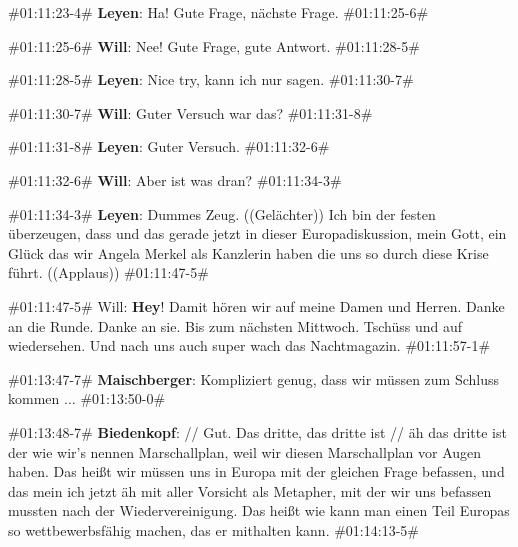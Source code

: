 {\begin{description}
\begin{linenumbers}
		\item \#01:11:23-4\# \textbf{Leyen}: Ha! Gute Frage, nächste Frage. \#01:11:25-6\# 
		
		\item \#01:11:25-6\# \textbf{Will}: Nee! Gute Frage, gute Antwort. \#01:11:28-5\# 
		
		\item \#01:11:28-5\# \textbf{Leyen}: Nice try, kann ich nur sagen. \#01:11:30-7\# 
		
		\item \#01:11:30-7\# \textbf{Will}: Guter Versuch war das? \#01:11:31-8\# 
		
		\item \#01:11:31-8\# \textbf{Leyen}: Guter Versuch. \#01:11:32-6\# 
		
		\item \#01:11:32-6\# \textbf{Will}: Aber ist was dran? \#01:11:34-3\# 
		
		\item \#01:11:34-3\# \textbf{Leyen}: Dummes Zeug. ((Gelächter)) Ich bin der festen überzeugen, dass und das gerade jetzt in dieser Europadiskussion, mein Gott, ein Glück das wir Angela Merkel als Kanzlerin haben die uns so durch diese Krise führt. ((Applaus)) \#01:11:47-5\# 
		
		\item \#01:11:47-5\# Will: \textbf{Hey}! Damit hören wir auf meine Damen und Herren. Danke an die Runde. Danke an sie. Bis zum nächsten Mittwoch. Tschüss und auf wiedersehen. Und nach uns auch super wach das Nachtmagazin. \#01:11:57-1\#
	\end{linenumbers}
	\label{lis:34}
\end{description}

\begin{description}
	\begin{linenumbers}
		\item \#01:13:47-7\# \textbf{Maischberger}: Kompliziert genug, dass wir müssen zum Schluss kommen $\ldots$ \#01:13:50-0\#
		
		\item \#01:13:48-7\# \textbf{Biedenkopf}: // Gut. Das dritte, das dritte ist // äh das dritte ist der wie wir's nennen Marschallplan, weil wir diesen Marschallplan vor Augen haben. Das heißt wir müssen uns in Europa mit der gleichen Frage befassen, und das mein ich jetzt äh mit aller Vorsicht als Metapher, mit der wir uns befassen mussten nach der Wiedervereinigung. Das heißt wie kann man einen Teil Europas so wettbewerbsfähig machen, das er mithalten kann. \#01:14:13-5\# 
		

\end{linenumbers}
\end{description}}
